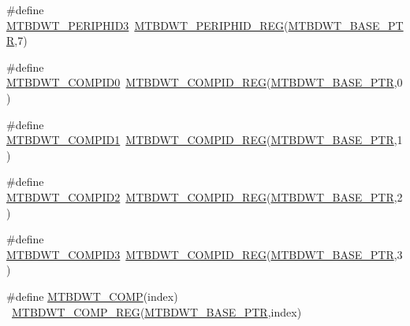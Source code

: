 \begin{DoxyCompactItemize}
\item 
\#define \hyperlink{group___m_t_b_d_w_t___register___accessor___macros_ga6496ee3e7267206af1ef1f6118c0bbcf}{M\+T\+B\+D\+W\+T\+\_\+\+P\+E\+R\+I\+P\+H\+I\+D3}~\hyperlink{group___m_t_b_d_w_t___register___accessor___macros_ga18a6f971f5ddf5bd0f3c5fd2d2b3b2da}{M\+T\+B\+D\+W\+T\+\_\+\+P\+E\+R\+I\+P\+H\+I\+D\+\_\+\+R\+EG}(\hyperlink{group___m_t_b_d_w_t___peripheral_ga97d048bfb5a11293a38c444b8347ff42}{M\+T\+B\+D\+W\+T\+\_\+\+B\+A\+S\+E\+\_\+\+P\+TR},7)
\item 
\#define \hyperlink{group___m_t_b_d_w_t___register___accessor___macros_gabea41b046757f76e965573ba1205b5b2}{M\+T\+B\+D\+W\+T\+\_\+\+C\+O\+M\+P\+I\+D0}~\hyperlink{group___m_t_b_d_w_t___register___accessor___macros_gae2528012848814bf317362965a786094}{M\+T\+B\+D\+W\+T\+\_\+\+C\+O\+M\+P\+I\+D\+\_\+\+R\+EG}(\hyperlink{group___m_t_b_d_w_t___peripheral_ga97d048bfb5a11293a38c444b8347ff42}{M\+T\+B\+D\+W\+T\+\_\+\+B\+A\+S\+E\+\_\+\+P\+TR},0)
\item 
\#define \hyperlink{group___m_t_b_d_w_t___register___accessor___macros_gad1e9f6c3c5eeeeab187787e6eff15d4e}{M\+T\+B\+D\+W\+T\+\_\+\+C\+O\+M\+P\+I\+D1}~\hyperlink{group___m_t_b_d_w_t___register___accessor___macros_gae2528012848814bf317362965a786094}{M\+T\+B\+D\+W\+T\+\_\+\+C\+O\+M\+P\+I\+D\+\_\+\+R\+EG}(\hyperlink{group___m_t_b_d_w_t___peripheral_ga97d048bfb5a11293a38c444b8347ff42}{M\+T\+B\+D\+W\+T\+\_\+\+B\+A\+S\+E\+\_\+\+P\+TR},1)
\item 
\#define \hyperlink{group___m_t_b_d_w_t___register___accessor___macros_gade8bf5b51854635778d28fbb31174a12}{M\+T\+B\+D\+W\+T\+\_\+\+C\+O\+M\+P\+I\+D2}~\hyperlink{group___m_t_b_d_w_t___register___accessor___macros_gae2528012848814bf317362965a786094}{M\+T\+B\+D\+W\+T\+\_\+\+C\+O\+M\+P\+I\+D\+\_\+\+R\+EG}(\hyperlink{group___m_t_b_d_w_t___peripheral_ga97d048bfb5a11293a38c444b8347ff42}{M\+T\+B\+D\+W\+T\+\_\+\+B\+A\+S\+E\+\_\+\+P\+TR},2)
\item 
\#define \hyperlink{group___m_t_b_d_w_t___register___accessor___macros_ga3a9bd5acf838d38819681843c6fea66f}{M\+T\+B\+D\+W\+T\+\_\+\+C\+O\+M\+P\+I\+D3}~\hyperlink{group___m_t_b_d_w_t___register___accessor___macros_gae2528012848814bf317362965a786094}{M\+T\+B\+D\+W\+T\+\_\+\+C\+O\+M\+P\+I\+D\+\_\+\+R\+EG}(\hyperlink{group___m_t_b_d_w_t___peripheral_ga97d048bfb5a11293a38c444b8347ff42}{M\+T\+B\+D\+W\+T\+\_\+\+B\+A\+S\+E\+\_\+\+P\+TR},3)
\item 
\#define \hyperlink{group___m_t_b_d_w_t___register___accessor___macros_ga0b5afc3bbf7fb33c708cb7ebff8d1b02}{M\+T\+B\+D\+W\+T\+\_\+\+C\+O\+MP}(index)                                          ~\hyperlink{group___m_t_b_d_w_t___register___accessor___macros_gad57476689dc41b49e09cc1ba8202f8e4}{M\+T\+B\+D\+W\+T\+\_\+\+C\+O\+M\+P\+\_\+\+R\+EG}(\hyperlink{group___m_t_b_d_w_t___peripheral_ga97d048bfb5a11293a38c444b8347ff42}{M\+T\+B\+D\+W\+T\+\_\+\+B\+A\+S\+E\+\_\+\+P\+TR},index)

\end{DoxyCompactItemize}
